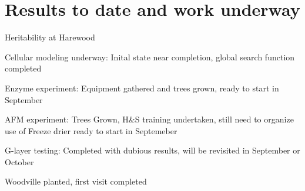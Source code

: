 \section{Results to date and work underway}
Heritability at Harewood

Cellular modeling underway:
Inital state near completion, global search function completed

Enzyme experiment: 
Equipment gathered and trees grown, ready to start in September

AFM experiment:
Trees Grown, H&S training undertaken, still need to organize use of Freeze drier
ready to start in Septemeber

G-layer testing:
Completed with dubious results, will be revisited in September or October

Woodville planted, first visit completed

  